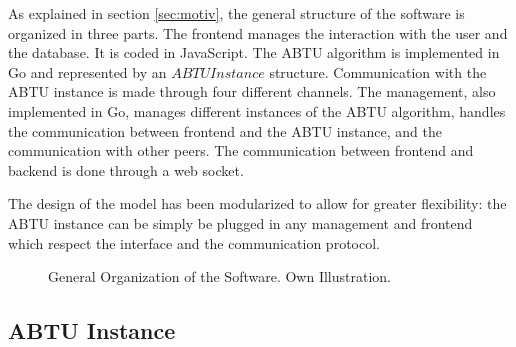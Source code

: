 \documentclass[11pt, a4paper, oneside, openright]{article} %
\begin{document}
As explained in section \ref{sec:motiv}, the general structure of the software is organized in three parts. The frontend manages the interaction with the user and the database. It is coded in JavaScript.
The ABTU algorithm is implemented in Go and represented by an $ABTUInstance$ structure. Communication with the ABTU instance is made through four different channels.
The management, also implemented in Go, manages different instances of the ABTU algorithm, handles the communication between frontend and the ABTU instance, and the communication with other peers.
The communication between frontend and backend is done through a web socket.

The design of the model has been modularized to allow for greater flexibility: the ABTU instance can be simply be plugged in any management and frontend which respect the interface and the communication protocol.

\begin{figure}[!h]
\begin{center}
\end{center}
\caption{General Organization of the Software. Own Illustration.\label{fig:softgen}}
\end{figure}

\subsection{ABTU Instance}
\end{document}

